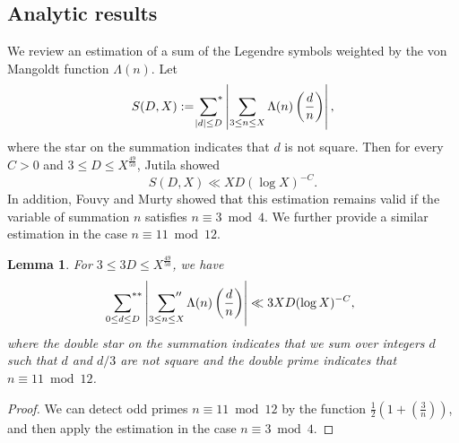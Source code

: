 \documentclass[a4paper, 11pt]{article}
\theoremstyle{plain}
\newtheorem{lem}[defn]{Lemma}
\newcommand{\?}{\textcolor{red}{??}}
\begin{document}
\subsection{Analytic results}
We review an estimation of a sum of the Legendre symbols weighted by the von Mangoldt function $\Lambda(n)$.
Let 
\[
S(D,X):=\sideset{}{^*} \sum_{|d| \le D} \left| \sum_{3 \le n \le X} \Lambda(n) \left( \frac{d}{n}\right) \right|,
\]
where the star on the summation indicates that $d$ is not  square. Then for every $C>0$ and $3 \le D \le X^{\frac{49}{50}}$, Jutila \cite[Lemma 8]{Ju} showed 
\[
S(D,X) \ll XD(\log X)^{-C}.
\]
In addition, Fouvy and Murty \cite[Lemma 6]{FM01} showed \textcolor{black}{that} this estimation remains valid if the variable of summation $n$ satisfies $n\equiv3\bmod 4$.
We further provide a similar estimation in the case $n \equiv11\bmod 12$.
\begin{lem}
\label{jutila}
For $3 \le 3D \le X^{\frac{49}{50}}$, we have
\[
\sideset{}{^{**}}\sum_{0\le d \le D} \left| \ \sideset{}{''} \sum_{3 \le n \le X} \Lambda(n) \left( \frac{d}{n}\right) \right| \ll  3XD(\log X)^{-C},
\]
where the double star on the summation indicates that we sum over integers $d$ such that $d$ and $d/3$ are not square and the double prime indicates that $n \equiv 11 \bmod 12$. 
\end{lem}
\begin{proof}
   We can detect odd primes $n \equiv 11 \bmod 12$ by the function $\frac{1}{2} \left(1+(\frac{3}{n})\right)$, and then apply the estimation in the case $n \equiv3 \bmod 4$. 
%
    \end{proof}
\end{document}
